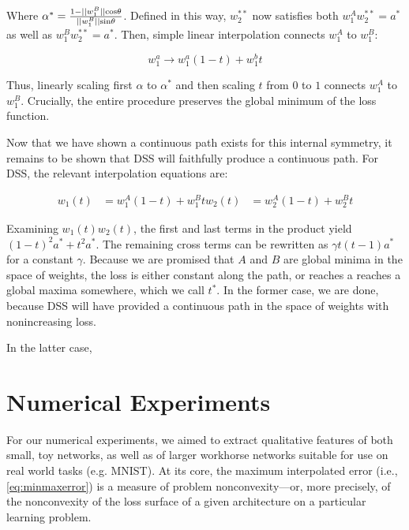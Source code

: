 \documentclass[twocolumn,superscriptaddress,aps,prb,floatfix]{revtex4-1}
\begin{document}
 Where $\alpha^*=\frac{1-||w_1^B||\rm{cos}\theta}{||w_1^B|| \rm{sin}\theta}$.  Defined in this way, $w_2^{**}$ now satisfies both $w_1^A w_2^{**} = a^*$ as well as $w_1^B w_2^{**} = a^*$.  Then, simple linear interpolation connects $w_1^A$ to $w_1^B$:
 
  \begin{equation}
 w_1^a \rightarrow w_1^a (1-t) + w_1^b t
  \end{equation}
  
  Thus, linearly scaling first $\alpha$ to $\alpha^*$ and then scaling $t$ from $0$ to $1$ connects $w_1^A$ to $w_1^B$.  Crucially, the entire procedure preserves the global minimum of the loss function.  
  
  Now that we have shown a continuous path exists for this internal symmetry, it remains to be shown that DSS will faithfully produce a continuous path.  For DSS, the relevant interpolation equations are:
  
  \begin{align}
  w_1(t) &= w_1^A (1-t) + w_1^B t
  w_2(t) &= w_2^A (1-t) + w_2^B t
  \end{align}
  
  Examining $w_1(t) w_2(t)$, the first and last terms in the product yield $(1-t)^2 a^* + t^2 a^*$.  The remaining cross terms can be rewritten as $\gamma t(t-1) a^*$ for a constant $\gamma$.  Because we are promised that $A$ and $B$ are global minima in the space of weights, the loss is either constant along the path, or reaches a reaches a global maxima somewhere, which we call $t^*$.  In the former case, we are done, because DSS will have provided a continuous path in the space of weights with nonincreasing loss.
 
  In the latter case, 
 
 
 
\section{Numerical Experiments}
\label{sec:NumExp}

For our numerical experiments, we aimed to extract qualitative features of both small, toy networks, as well as of larger workhorse networks suitable for use on real world tasks (e.g. MNIST).  At its core, the maximum interpolated error (i.e., \eqref{eq:minmaxerror}) is a measure of problem nonconvexity---or, more precisely, of the nonconvexity of the loss surface of a given architecture on a particular learning problem.
\end{document}
